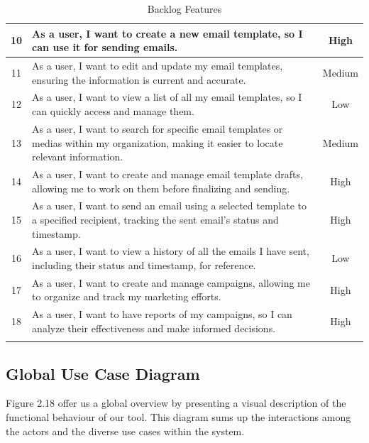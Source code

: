 \begin{longtable}{|c|p{}|c|}
	\hline
	10          & As a user, I want to create a new email template, so I can use it for sending emails. & High \\
	\hline
	11          & As a user, I want to edit and update my email templates, ensuring the information is current and accurate. & Medium \\
	\hline
	12          & As a user, I want to view a list of all my email templates, so I can quickly access and manage them. & Low \\
	\hline
	13          & As a user, I want to search for specific email templates or medias within my organization, making it easier to locate relevant information. & Medium \\
	\hline
	14          & As a user, I want to create and manage email template drafts, allowing me to work on them before finalizing and sending. & High \\
	\hline
	15          & As a user, I want to send an email using a selected template to a specified recipient, tracking the sent email's status and timestamp. & High \\
	\hline
	16          & As a user, I want to view a history of all the emails I have sent, including their status and timestamp, for reference. & Low \\
	\hline
	17          & As a user, I want to create and manage campaigns, allowing me to organize and track my marketing efforts. & High \\
	\hline
	18          & As a user, I want to have reports of my campaigns, so I can analyze their effectiveness and make informed decisions. & High \\
	\hline
	\caption{Backlog Features}
	\label{tab:Backlog Features}
\end{longtable}


\newpage

\subsection{Global Use Case Diagram}
Figure 2.18 offer us a global overview by presenting a visual description of the functional
behaviour of our tool. This diagram sums up the interactions among the actors and the
diverse use cases within the system.

